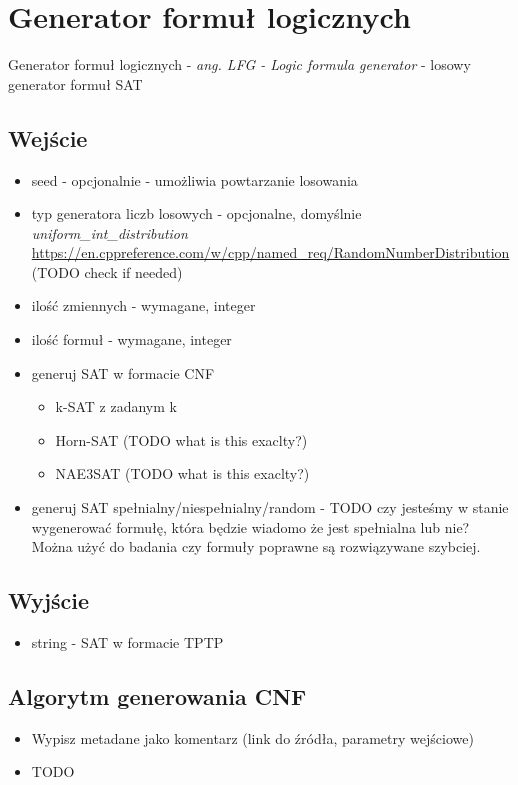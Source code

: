 \documentclass[a4paper,12pt]{article}
\begin{document}
\section{Generator formuł logicznych} \label{LFG}

Generator formuł logicznych - \textit{ang. LFG - Logic formula generator} - losowy generator formuł SAT

\subsection{Wejście}

\begin{itemize}
  \item seed - opcjonalnie - umożliwia powtarzanie losowania
  \item typ generatora liczb losowych - opcjonalne, domyślnie \textit{uniform\_int\_distribution} \url{https://en.cppreference.com/w/cpp/named_req/RandomNumberDistribution} (TODO check if needed)
  \item ilość zmiennych - wymagane, integer
  \item ilość formuł - wymagane, integer
  \item generuj \gls{SAT} w formacie \gls{CNF}
    \begin{itemize}
      \item k-SAT z zadanym k
      \item Horn-SAT (TODO what is this exaclty?)
      \item NAE3SAT (TODO what is this exaclty?)
    \end{itemize}
  \item generuj \gls{SAT} spełnialny/niespełnialny/random - TODO czy jesteśmy w stanie wygenerować formułę, która będzie wiadomo że jest spełnialna lub nie? Można użyć do badania czy formuły poprawne są rozwiązywane szybciej.
\end{itemize}

\subsection{Wyjście}

\begin{itemize}
  \item string - SAT w formacie TPTP
\end{itemize}

\subsection{Algorytm generowania CNF}
\begin{itemize}
  \item Wypisz metadane jako komentarz (link do źródła, parametry wejściowe)
  \item TODO
\end{itemize}
\end{document}
